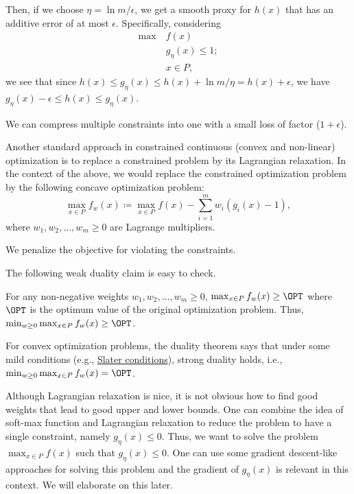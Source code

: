 Then, if we choose \(\eta = \ln m / \epsilon \), we get a smooth proxy for \(h(x)\) that has an additive error of at most \(\epsilon \). Specifically, considering
\[
	\begin{aligned}
		\max~ & f(x)               \\
		      & g_\eta (x) \leq 1; \\
		      & x \in P,
	\end{aligned}
\]
we see that since \(h(x) \leq g_\eta (x) \leq h(x) + \ln m / \eta = h(x) + \epsilon \), we have \(g_\eta (x) - \epsilon \leq h(x) \leq g_\eta (x)\).

\begin{remark}
	We can compress multiple constraints into one with a small loss of factor (\(1 + \epsilon \)).
\end{remark}

Another standard approach in constrained continuous (convex and non-linear) optimization is to replace a constrained problem by its Lagrangian relaxation. In the context of the above, we would replace the constrained optimization problem by the following concave optimization problem:
\[
	\max_{x \in P} f_w(x) \coloneqq \max _{x \in P} f(x) - \sum_{i=1}^{m} w_i(g_i(x) - 1),
\]
where \(w_1, w_2, \dots , w_m \geq 0\) are Lagrange multipliers.

\begin{intuition}
	We penalize the objective for violating the constraints.
\end{intuition}

The following weak duality claim is easy to check.

\begin{claim}
	For any non-negative weights \(w_1, w_2, \dots , w_m \geq 0\), \(\max _{x \in P} f_w(x) \geq \OPT\) where \(\OPT\) is the optimum value of the original optimization problem. Thus, \(\min _{w\geq 0} \max _{x \in P} f_w(x) \geq \OPT\).
\end{claim}

For convex optimization problems, the duality theorem says that under some mild conditions (e.g., \href{https://en.wikipedia.org/wiki/Slater%27s_condition}{Slater conditions}), strong duality holds, i.e., \(\min _{w \geq 0} \max _{x \in P} f_w(x) = \OPT\).

Although Lagrangian relaxation is nice, it is not obvious how to find good weights that lead to good upper and lower bounds. One can combine the idea of soft-max function and Lagrangian relaxation to reduce the problem to have a single constraint, namely \(g_\eta (x) \leq 0\). Thus, we want to solve the problem \(\max _{x \in P} f(x)\) such that \(g_\eta (x) \leq 0\). One can use some gradient descent-like approaches for solving this problem and the gradient of \(g_\eta (x)\) is relevant in this context. We will elaborate on this later.

